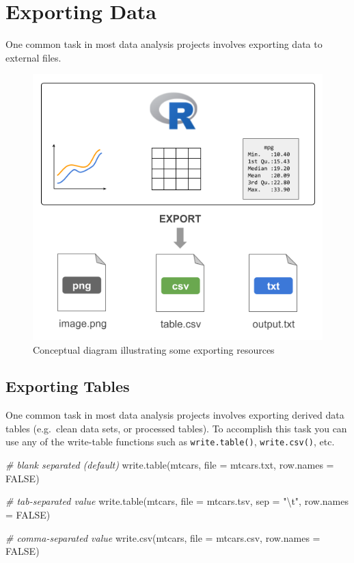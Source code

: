 \documentclass[
]{book}
\newenvironment{Shaded}{\begin{snugshade}}{\end{snugshade}}
\newcommand{\AttributeTok}[1]{\textcolor[rgb]{0.77,0.63,0.00}{#1}}
\newcommand{\CommentTok}[1]{\textcolor[rgb]{0.56,0.35,0.01}{\textit{#1}}}
\newcommand{\ConstantTok}[1]{\textcolor[rgb]{0.00,0.00,0.00}{#1}}
\newcommand{\FunctionTok}[1]{\textcolor[rgb]{0.00,0.00,0.00}{#1}}
\newcommand{\NormalTok}[1]{#1}
\newcommand{\SpecialCharTok}[1]{\textcolor[rgb]{0.00,0.00,0.00}{#1}}
\newcommand{\StringTok}[1]{\textcolor[rgb]{0.31,0.60,0.02}{#1}}
\begin{document}
\hypertarget{export-data}{%
\chapter{Exporting Data}\label{export-data}}

One common task in most data analysis projects involves exporting data to
external files.

\begin{figure}

{\centering \includegraphics[width=0.6\linewidth]{images/inout/export-resources} 

}

\caption{Conceptual diagram illustrating some exporting resources}\label{fig:unnamed-chunk-385}
\end{figure}

\hypertarget{exporting-tables}{%
\section{Exporting Tables}\label{exporting-tables}}

One common task in most data analysis projects involves exporting derived
data tables (e.g.~clean data sets, or processed tables). To accomplish this
task you can use any of the write-table functions such as \texttt{write.table()},
\texttt{write.csv()}, etc.

\begin{Shaded}
\begin{Highlighting}[]
\CommentTok{\# blank separated (default)}
\FunctionTok{write.table}\NormalTok{(mtcars, }\AttributeTok{file =} \StringTok{\textquotesingle{}mtcars.txt\textquotesingle{}}\NormalTok{, }\AttributeTok{row.names =} \ConstantTok{FALSE}\NormalTok{)}

\CommentTok{\# tab{-}separated value}
\FunctionTok{write.table}\NormalTok{(mtcars, }\AttributeTok{file =} \StringTok{\textquotesingle{}mtcars.tsv\textquotesingle{}}\NormalTok{, }\AttributeTok{sep =} \StringTok{"}\SpecialCharTok{\textbackslash{}t}\StringTok{"}\NormalTok{, }\AttributeTok{row.names =} \ConstantTok{FALSE}\NormalTok{)}

\CommentTok{\# comma{-}separated value}
\FunctionTok{write.csv}\NormalTok{(mtcars, }\AttributeTok{file =} \StringTok{\textquotesingle{}mtcars.csv\textquotesingle{}}\NormalTok{, }\AttributeTok{row.names =} \ConstantTok{FALSE}\NormalTok{)}
\end{Highlighting}
\end{Shaded}
\end{document}
